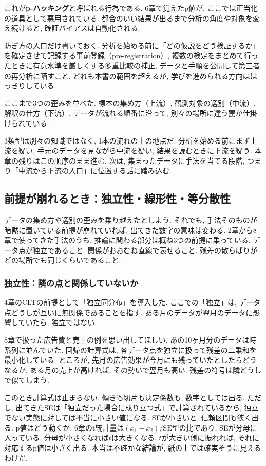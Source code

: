 これが\textbf{p-ハッキング}と呼ばれる行為である.
6章で覚えたp値が, ここでは正当化の道具として悪用されている.
都合のいい結果が出るまで分析の角度や対象を変え続けると, 確証バイアスは自動化される.

防ぎ方の入口だけ書いておく.
分析を始める前に「どの仮説をどう検証するか」を確定させて記録する事前登録（pre-registration）, 複数の検定をまとめて行ったときに有意水準を厳しくする多重比較の補正, データと手順を公開して第三者の再分析に晒すこと.
どれも本書の範囲を超えるが, 学びを進められる方向ははっきりしている.

ここまで3つの歪みを並べた.
標本の集め方（上流）, 観測対象の選別（中流）, 解釈の仕方（下流）.
データが流れる順番に沿って, 別々の場所に違う罠が仕掛けられている.

3類型は別々の知識ではなく, 1本の流れの上の地点だ.
分析を始める前にまず上流を疑い, 手元のデータを見ながら中流を疑い, 結果を読むときに下流を疑う.
本章の残りはこの順序のまま進む.
次は, 集まったデータに手法を当てる段階, つまり「中流から下流の入口」に位置する話に踏み込む.


\subsection{前提が崩れるとき：独立性・線形性・等分散性}

データの集め方や選別の歪みを乗り越えたとしよう.
それでも, 手法そのものが暗黙に置いている前提が崩れていれば, 出てきた数字の意味は変わる.
2章から8章で使ってきた手法のうち, 推論に関わる部分は概ね3つの前提に乗っている.
データ点が独立であること. 関係がおおむね直線で表せること. 残差の散らばりがどの場所でも同じくらいであること.

\subsubsection*{独立性：隣の点と関係していないか}

4章のCLTの前提として「独立同分布」を導入した.
ここでの「独立」は, データ点どうしが互いに無関係であることを指す.
ある月のデータが翌月のデータに影響していたら, 独立ではない.

8章で扱った広告費と売上の例を思い出してほしい.
あの10ヶ月分のデータは時系列に並んでいた.
回帰の計算式は, 各データ点を独立に扱って残差の二乗和を最小化している.
ところが, 先月の広告効果が今月にも残っていたとしたらどうなるか.
ある月の売上が高ければ, その勢いで翌月も高い. 残差の符号は隣どうしで似てしまう.

このとき計算式は止まらない. 傾きも切片も決定係数も, 数字としては出る.
ただし, 出てきたSEは「独立だった場合に成り立つ式」で計算されているから, 独立でない実態に対しては不当に小さい値になる.
SEが小さいと, 信頼区間も狭く出る.
p値はどう動くか. 6章のt統計量は$(\bar{x}_1-\bar{x}_2)/\mathrm{SE}$型の比であり, SEが分母に入っている.
分母が小さくなれば$t$は大きくなる. $t$が大きい側に振れれば, それに対応するp値は小さく出る.
本当は不確かな結論が, 紙の上では確実そうに見えるわけだ.

